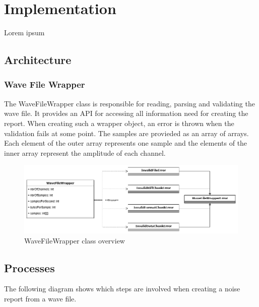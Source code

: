 \section{Implementation}
Lorem ipsum

\subsection{Architecture}

\subsubsection{Wave File Wrapper}
The WaveFileWrapper class is responsible for reading, parsing and validating the wave file. It provides an API for accessing all information need for creating the report. When creating such a wrapper object, an error is thrown when the validation fails at some point. The samples are provieded as an array of arrays. Each element of the outer array represents one sample and the elements of the inner array represent the amplitude of each channel. 

\begin{figure}[H]
    \centering
    \includegraphics[width=1.0\textwidth]{../assets/wave_file_wrapper.png}
    \caption{WaveFileWrapper class overview}
\end{figure}

\subsection{Processes}
The following diagram shows which steps are involved when creating a noise report from a wave file.

